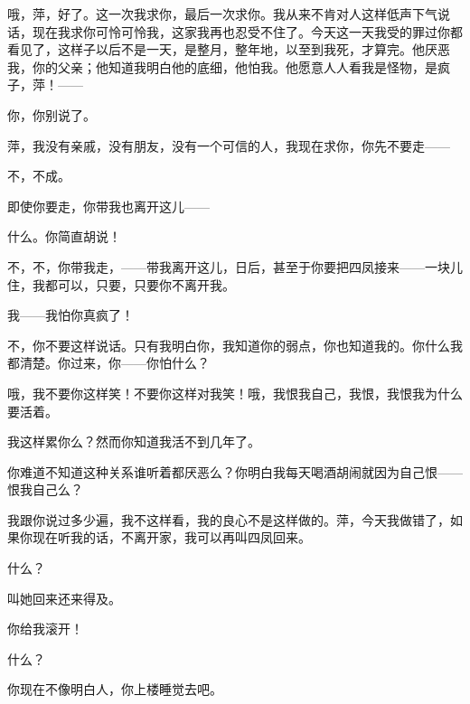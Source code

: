 哦，萍，好了。这一次我求你，最后一次求你。我从来不肯对人这样低声下气说话，现在我求你可怜可怜我，这家我再也忍受不住了。今天这一天我受的罪过你都看见了，这样子以后不是一天，是整月，整年地，以至到我死，才算完。他厌恶我，你的父亲；他知道我明白他的底细，他怕我。他愿意人人看我是怪物，是疯子，萍！——

你，你别说了。

萍，我没有亲戚，没有朋友，没有一个可信的人，我现在求你，你先不要走——

不，不成。

即使你要走，你带我也离开这儿——

什么。你简直胡说！

不，不，你带我走，——带我离开这儿，日后，甚至于你要把四凤接来——一块儿住，我都可以，只要，只要你不离开我。

我——我怕你真疯了！

不，你不要这样说话。只有我明白你，我知道你的弱点，你也知道我的。你什么我都清楚。你过来，你——你怕什么？

哦，我不要你这样笑！不要你这样对我笑！哦，我恨我自己，我恨，我恨我为什么要活着。

我这样累你么？然而你知道我活不到几年了。

你难道不知道这种关系谁听着都厌恶么？你明白我每天喝酒胡闹就因为自己恨——恨我自己么？

我跟你说过多少遍，我不这样看，我的良心不是这样做的。萍，今天我做错了，如果你现在听我的话，不离开家，我可以再叫四凤回来。

什么？

叫她回来还来得及。

你给我滚开！

什么？

你现在不像明白人，你上楼睡觉去吧。

